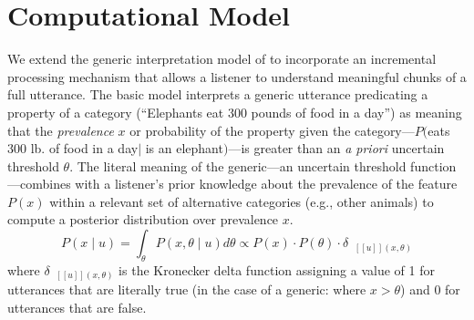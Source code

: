 \documentclass[10pt,letterpaper]{article}
\providecommand{\tightlist}{%
  \setlength{\itemsep}{0pt}\setlength{\parskip}{0pt}}
\newcommand{\denote}[1]{\mbox{ $[\![ #1 ]\!]$}}
\begin{document}
%
%

\section{Computational Model}

We extend the generic interpretation model of  to incorporate an incremental processing mechanism that allows a listener to understand meaningful chunks of a full utterance.
The basic model interprets a generic utterance predicating a property of a category (``Elephants eat 300 pounds of food in a day'') as meaning that the \emph{prevalence} $x$ or probability of the property given the category---$P($eats 300 lb. of food in a day$\mid$ is an elephant$)$---is greater than an \emph{a priori} uncertain threshold $\theta$. 
The literal meaning of the generic---an uncertain threshold function---combines with a listener's prior knowledge about the prevalence of the feature $P(x)$ within a relevant set of alternative categories (e.g., other animals) to compute a posterior distribution over prevalence $x$. 
\begin{equation}
P(x \mid u) = \int_{\theta} P(x, \theta \mid u)  d\theta \propto P(x) \cdot P(\theta) \cdot \delta_{\denote{u}(x, \theta)} 
\label{eq:L0}
\end{equation}
\noindent where $\delta_{\denote{u}(x, \theta)}$ is the Kronecker delta function assigning a value of 1 for utterances that are literally true (in the case of a generic: where $x > \theta$) and 0 for utterances that are false.
\end{document}

